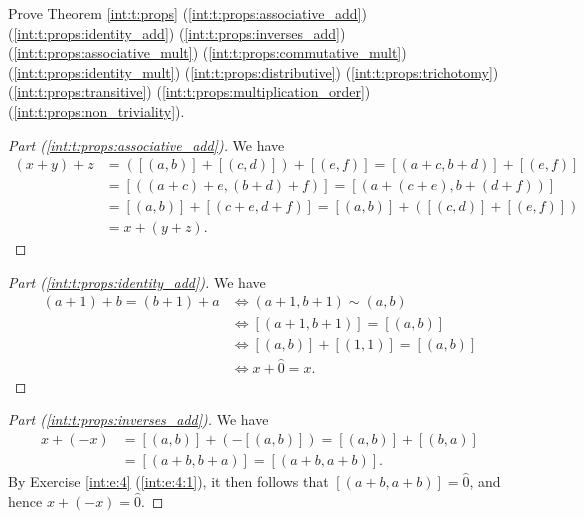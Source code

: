 \Newpage
\begin{exercise} %
	Prove Theorem \ref{int:t:props} (\ref{int:t:props:associative_add}) (\ref{int:t:props:identity_add}) (\ref{int:t:props:inverses_add}) (\ref{int:t:props:associative_mult}) (\ref{int:t:props:commutative_mult}) (\ref{int:t:props:identity_mult}) (\ref{int:t:props:distributive}) (\ref{int:t:props:trichotomy}) (\ref{int:t:props:transitive}) (\ref{int:t:props:multiplication_order}) (\ref{int:t:props:non_triviality}).
\end{exercise}

\begin{proof}[Part (\ref{int:t:props:associative_add})]
	We have
	\begin{align*}
		(x + y) + z & = ([(a, b)] + [(c, d)]) + [(e, f)] = [(a + c, b + d)] + [(e, f)] \\
		            & = [((a + c) + e, (b + d) + f)] = [(a + (c + e), b + (d + f))]    \\
		            & = [(a, b)] + [(c + e, d + f)] = [(a, b)] + ([(c, d)] + [(e, f)]) \\
		            & = x + (y + z).
	\end{align*}
\end{proof}

\begin{proof}[Part (\ref{int:t:props:identity_add})]
	We have
	\begin{align*}
		(a + 1) + b = (b + 1) + a & \iff (a + 1, b + 1)      \sim (a, b) \\
		                          & \iff [(a + 1, b + 1)]    = [(a, b)]  \\
		                          & \iff [(a, b)] + [(1, 1)] = [(a, b)]  \\
		                          & \iff x + \hat{0}         = x.
	\end{align*}
\end{proof}

\begin{proof}[Part (\ref{int:t:props:inverses_add})]
	We have
	\begin{align*}
		x + (-x) & = [(a, b)] + (-[(a, b)]) = [(a, b)] + [(b, a)] \\
		         & = [(a + b, b + a)] = [(a + b, a + b)].
	\end{align*}
	By Exercise \ref{int:e:4} (\ref{int:e:4:1}), it then follows that $[(a + b, a + b)] = \hat{0}$, and hence $x + (-x) = \hat{0}$.
\end{proof}

